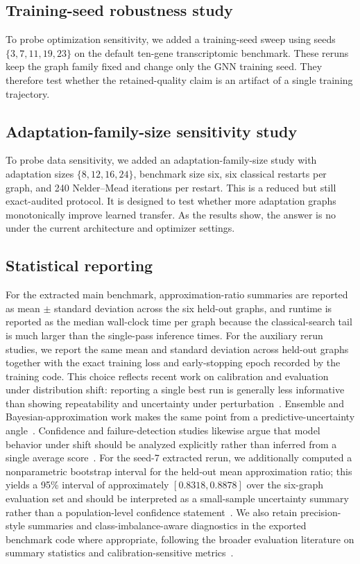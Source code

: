 \documentclass[
  reprint,
  twocolumn,
  aps,
  superscriptaddress,
  longbibliography,
  floatfix
]{revtex4-2}
\begin{document}
\subsection{Training-seed robustness study}
To probe optimization sensitivity, we added a training-seed sweep using seeds $\{3,7,11,19,23\}$ on the default ten-gene transcriptomic benchmark. These reruns keep the graph family fixed and change only the GNN training seed. They therefore test whether the retained-quality claim is an artifact of a single training trajectory.

\subsection{Adaptation-family-size sensitivity study}
To probe data sensitivity, we added an adaptation-family-size study with adaptation sizes $\{8,12,16,24\}$, benchmark size six, six classical restarts per graph, and 240 Nelder--Mead iterations per restart. This is a reduced but still exact-audited protocol. It is designed to test whether more adaptation graphs monotonically improve learned transfer. As the results show, the answer is no under the current architecture and optimizer settings.

\subsection{Statistical reporting}
For the extracted main benchmark, approximation-ratio summaries are reported as mean $\pm$ standard deviation across the six held-out graphs, and runtime is reported as the median wall-clock time per graph because the classical-search tail is much larger than the single-pass inference times. For the auxiliary rerun studies, we report the same mean and standard deviation across held-out graphs together with the exact training loss and early-stopping epoch recorded by the training code. This choice reflects recent work on calibration and evaluation under distribution shift: reporting a single best run is generally less informative than showing repeatability and uncertainty under perturbation~\cite{guo2017,ovadia2019}. Ensemble and Bayesian-approximation work makes the same point from a predictive-uncertainty angle~\cite{gal2016,kuleshov2018}. Confidence and failure-detection studies likewise argue that model behavior under shift should be analyzed explicitly rather than inferred from a single average score~\cite{jiang2018,corbiere2019}. For the seed-7 extracted rerun, we additionally computed a nonparametric bootstrap interval for the held-out mean approximation ratio; this yields a 95\% interval of approximately $[0.8318, 0.8878]$ over the six-graph evaluation set and should be interpreted as a small-sample uncertainty summary rather than a population-level confidence statement~\cite{lakshminarayanan2017,minderer2021}. We also retain precision-style summaries and class-imbalance-aware diagnostics in the exported benchmark code where appropriate, following the broader evaluation literature on summary statistics and calibration-sensitive metrics~\cite{davis2006,thulasidasan2019}.
\end{document}
